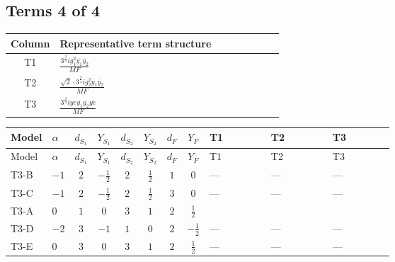 \documentclass[8pt]{article}
\begin{document}
\begin{landscape}
\subsection*{Terms 4 of 4}
\begin{center}
\begin{tabular}{@{}c >{\raggedright\arraybackslash}p{0.82\linewidth}@{}}
\toprule
Column & Representative term structure \\
\midrule
T1 & \(\displaystyle \frac{3^{\frac{3}{4}} i g_{1}^{2} \overline{y_{1}} \overline{y_{2}}}{MF}\) \\
\midrule
T2 & \(\displaystyle \frac{\sqrt{2} \cdot 3^{\frac{3}{4}} i g_{2}^{2} \overline{y_{1}} \overline{y_{2}}}{MF}\) \\
\midrule
T3 & \(\displaystyle \frac{3^{\frac{3}{4}} i ye \overline{y_{1}} \overline{y_{2}} \overline{ye}}{MF}\) \\
\midrule
\bottomrule
\end{tabular}
\end{center}
\smallskip
\tiny
\begin{longtable}{@{}llcccccc >{\raggedright\arraybackslash}p{0.21\linewidth} >{\raggedright\arraybackslash}p{0.21\linewidth} >{\raggedright\arraybackslash}p{0.21\linewidth}@{}}
\toprule
Model & $\alpha$ & $d_{S_1}$ & $Y_{S_1}$ & $d_{S_2}$ & $Y_{S_2}$ & $d_F$ & $Y_F$ & T1 & T2 & T3 \\
\midrule
\endfirsthead
\toprule
Model & $\alpha$ & $d_{S_1}$ & $Y_{S_1}$ & $d_{S_2}$ & $Y_{S_2}$ & $d_F$ & $Y_F$ & T1 & T2 & T3 \\
\midrule
\endhead
T3-B & $-1$ & $2$ & $-\frac{1}{2}$ & $2$ & $\frac{1}{2}$ & $1$ & $0$ & --- & --- & --- \\
\midrule
T3-C & $-1$ & $2$ & $-\frac{1}{2}$ & $2$ & $\frac{1}{2}$ & $3$ & $0$ & --- & --- & --- \\
\midrule
T3-A & $0$ & $1$ & $0$ & $3$ & $1$ & $2$ & $\frac{1}{2}$ & \scriptsize\adjustbox{max width=\linewidth}{$\begin{gathered} - \frac{3^{\frac{3}{4}} i g_{1}^{2} \overline{y_{1}} \overline{y_{2}}}{8 MF}\end{gathered}$} & \scriptsize\adjustbox{max width=\linewidth}{$\begin{gathered} - \frac{\sqrt{2} \cdot 3^{\frac{3}{4}} i g_{2}^{2} \overline{y_{1}} \overline{y_{2}}}{6 MF}\end{gathered}$} & \scriptsize\adjustbox{max width=\linewidth}{$\begin{gathered} \frac{3^{\frac{3}{4}} i ye \overline{y_{1}} \overline{y_{2}} \overline{ye}}{12 MF}\end{gathered}$} \\
\midrule
T3-D & $-2$ & $3$ & $-1$ & $1$ & $0$ & $2$ & $-\frac{1}{2}$ & --- & --- & --- \\
\midrule
T3-E & $0$ & $3$ & $0$ & $3$ & $1$ & $2$ & $\frac{1}{2}$ & --- & --- & --- \\
\midrule
\bottomrule
\end{longtable}
\clearpage

\end{landscape}
\end{document}
